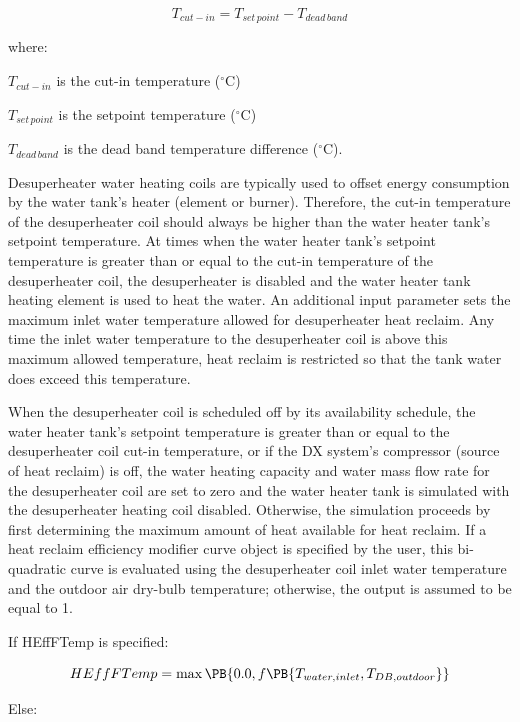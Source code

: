\begin{equation}
{T_{cut - in}} = {T_{set\,point}} - {T_{dead\,band}}
\end{equation}

where:

\({T_{cut - in}}\) is the cut-in temperature (\(^{\circ}\)C)

\({T_{set\,point}}\) is the setpoint temperature (\(^{\circ}\)C)

\({T_{dead\,band}}\) is the dead band temperature difference (\(^{\circ}\)C).

Desuperheater water heating coils are typically used to offset energy consumption by the water tank's heater (element or burner). Therefore, the cut-in temperature of the desuperheater coil should always be higher than the water heater tank's setpoint temperature. At times when the water heater tank's setpoint temperature is greater than or equal to the cut-in temperature of the desuperheater coil, the desuperheater is disabled and the water heater tank heating element is used to heat the water. An additional input parameter sets the maximum inlet water temperature allowed for desuperheater heat reclaim. Any time the inlet water temperature to the desuperheater coil is above this maximum allowed temperature, heat reclaim is restricted so that the tank water does exceed this temperature.

When the desuperheater coil is scheduled off by its availability schedule, the water heater tank's setpoint temperature is greater than or equal to the desuperheater coil cut-in temperature, or if the DX system's compressor (source of heat reclaim) is off, the water heating capacity and water mass flow rate for the desuperheater coil are set to zero and the water heater tank is simulated with the desuperheater heating coil disabled. Otherwise, the simulation proceeds by first determining the maximum amount of heat available for heat reclaim. If a heat reclaim efficiency modifier curve object is specified by the user, this bi-quadratic curve is evaluated using the desuperheater coil inlet water temperature and the outdoor air dry-bulb temperature; otherwise, the output is assumed to be equal to 1.

If HEffFTemp is specified:

\begin{equation}
  HEffFTemp = \max\PB{0.0, f\PB{T_{water,inlet},T_{DB,outdoor}}}
\end{equation}

Else:

